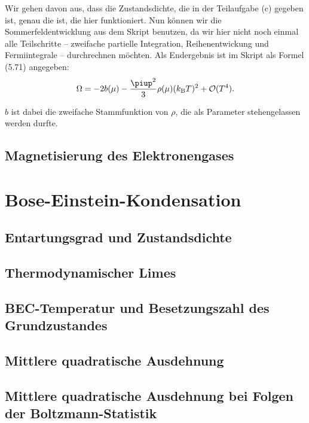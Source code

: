 Wir gehen davon aus, dass die Zustandsdichte, die in der Teilaufgabe (c)
gegeben ist, genau die ist, die hier funktioniert. Nun können wir die
Sommerfeldentwicklung aus dem Skript benutzen, da wir hier nicht noch einmal
alle Teilschritte – zweifache partielle Integration, Reihenentwickung und
Fermiintegrale – durchrechnen möchten. Als Endergebnis ist im Skript als Formel
(5.71) angegeben:
\[
    \Omega = - 2 b(\mu) - \frac{\piup^2}3 \rho(\mu) (\kB T)^2 + \mathcal
    O(T^4).
\]

$b$ ist dabei die zweifache Stammfunktion von $\rho$, die als Parameter
stehengelassen werden durfte.

\subsection{Magnetisierung des Elektronengases}

\fehlt

\section{Bose-Einstein-Kondensation}

\subsection{Entartungsgrad und Zustandsdichte}

\fehlt

\subsection{Thermodynamischer Limes}

\fehlt

\subsection{BEC-Temperatur und Besetzungszahl des Grundzustandes}

\fehlt

\subsection{Mittlere quadratische Ausdehnung}

\fehlt

\subsection{Mittlere quadratische Ausdehnung bei Folgen der Boltzmann-Statistik}

\fehlt

\IfFileExists{\bibliographyfile}{
    \printbibliography
}{}



